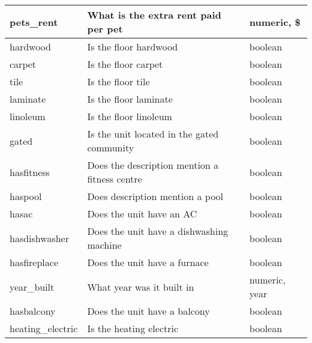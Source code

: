 \documentclass[12pt]{report}
\begin{document}
\begin{longtable}{|p{4cm}|p{8.7cm}|p{2.5cm}|}
	pets\_rent                         & What is the extra rent paid per pet                                 & numeric, \$      \\ \hline
	hardwood                           & Is the floor hardwood                                               & boolean          \\ \hline
	carpet                             & Is the floor carpet                                                 & boolean          \\ \hline
	tile                               & Is the floor tile                                                   & boolean          \\ \hline
	laminate                           & Is the floor laminate                                               & boolean          \\ \hline
	linoleum                           & Is the floor linoleum                                               & boolean          \\ \hline
	gated                              & Is the unit located in the gated community                          & boolean          \\ \hline
	hasfitness                         & Does the description mention a fitness centre                       & boolean          \\ \hline
	haspool                            & Does description mention a pool                                     & boolean          \\ \hline
	hasac                              & Does the unit have an AC                                            & boolean          \\ \hline
	hasdishwasher                      & Does the unit have a dishwashing machine                            & boolean          \\ \hline
	hasfireplace                       & Does the unit have a furnace                                        & boolean          \\ \hline
	year\_built                        & What year was it built in                                           & numeric, year    \\ \hline
	hasbalcony                         & Does the unit have a balcony                                        & boolean          \\ \hline
	heating\_electric                  & Is the heating electric                                             & boolean          \\ \hline

\end{longtable}
\end{document}
